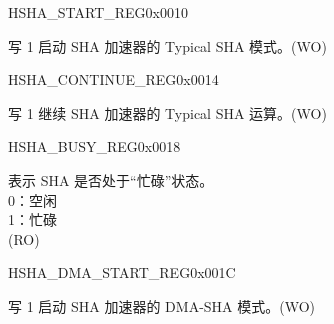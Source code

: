 \begin{register}{H}{SHA\_START\_REG}{0x0010}\label{regdesc:SHASTARTREG}
%
%
\regnewline%
\begin{regdesc}\begin{reglist}
\label{fielddesc:SHASTART}\item [SHA\_START] 写 1 启动 SHA 加速器的 Typical SHA 模式。(WO)
\end{reglist}\end{regdesc}
\end{register}


\begin{register}{H}{SHA\_CONTINUE\_REG}{0x0014}\label{regdesc:SHACONTINUEREG}
%
%
\regnewline%
\begin{regdesc}\begin{reglist}
\label{fielddesc:SHACONTINUE}\item [SHA\_CONTINUE] 写 1 继续 SHA 加速器的 Typical SHA 运算。(WO)
\end{reglist}\end{regdesc}
\end{register}


\begin{register}{H}{SHA\_BUSY\_REG}{0x0018}\label{regdesc:SHABUSYREG}
%
%
\regnewline%
\begin{regdesc}\begin{reglist}
\label{fielddesc:SHABUSYSTATE}\item [SHA\_BUSY\_STATE] 表示 SHA 是否处于“忙碌”状态。\\
0：空闲\\
1：忙碌 \\
(RO)
\end{reglist}\end{regdesc}
\end{register}


\begin{register}{H}{SHA\_DMA\_START\_REG}{0x001C}\label{regdesc:SHADMASTARTREG}
%
%
\regnewline%
\begin{regdesc}\begin{reglist}
\label{fielddesc:SHADMASTART}\item [SHA\_DMA\_START] 写 1 启动 SHA 加速器的 DMA-SHA 模式。(WO)
\end{reglist}\end{regdesc}
\end{register}



